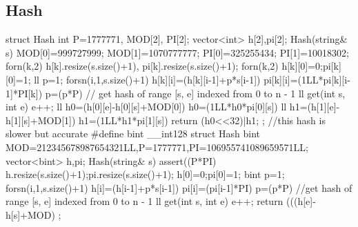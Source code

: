 \documentclass[10pt, landscape, twocolumn, a4paper, notitlepage]{article}
\begin{document}
\subsection{Hash}
\begin{code}
struct Hash {
	int P=1777771, MOD[2], PI[2];
	vector<int> h[2],pi[2];
	Hash(string& s){
		MOD[0]=999727999; MOD[1]=1070777777;
		PI[0]=325255434; PI[1]=10018302;
		forn(k,2) h[k].resize(s.size()+1), pi[k].resize(s.size()+1);
		forn(k,2){
			h[k][0]=0;pi[k][0]=1;
			ll p=1;
			forsn(i,1,s.size()+1){
				h[k][i]=(h[k][i-1]+p*s[i-1])%
				pi[k][i]=(1LL*pi[k][i-1]*PI[k])%
				p=(p*P)%
			}
		}
	}
   	 // get hash of range [s, e] indexed from 0 to n - 1
	ll get(int s, int e){
	    	e++;
		ll h0=(h[0][e]-h[0][s]+MOD[0])%
		h0=(1LL*h0*pi[0][s])%
		ll h1=(h[1][e]-h[1][s]+MOD[1])%
		h1=(1LL*h1*pi[1][s])%
		return (h0<<32)|h1;
	}
};
//this hash is slower but accurate
#define bint __int128
struct Hash {
	bint MOD=212345678987654321LL,P=1777771,PI=106955741089659571LL;
	vector<bint> h,pi;
	Hash(string& s){
		assert((P*PI)%
		h.resize(s.size()+1);pi.resize(s.size()+1);
		h[0]=0;pi[0]=1;
		bint p=1;
		forsn(i,1,s.size()+1){
			h[i]=(h[i-1]+p*s[i-1])%
			pi[i]=(pi[i-1]*PI)%
			p=(p*P)%
		}
	}
	//get hash of range [s, e] indexed from 0 to n - 1
	ll get(int s, int e){
		e++;
		return (((h[e]-h[s]+MOD)%
	}
};
\end{code}
\end{document}
